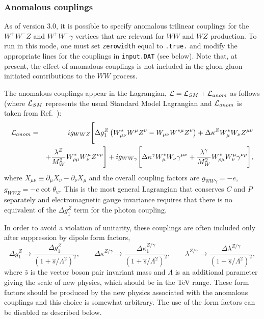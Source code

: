 \documentclass{article}
\begin{document}
\subsubsection{Anomalous couplings}

\label{sec:anomalous}
As of version 3.0, it is possible to specify anomalous trilinear
couplings for the $W^+W^-Z$ and $W^+W^-\gamma$ vertices that are
relevant for $WW$ and $WZ$ production. To run in this mode, one
must set {\tt zerowidth} equal to {\tt .true.}
and modify the appropriate lines for the couplings in {\tt input.DAT}
(see below). Note that, at present, the effect of anomalous couplings is not included
in the gluon-gluon initiated contributions to the $WW$ process.

The anomalous couplings appear in the Lagrangian,
${\cal L} = {\cal L}_{SM} + {\cal L}_{anom}$ as follows
(where ${\cal L}_{SM}$ represents the usual Standard Model Lagrangian and
${\cal L}_{anom}$ is taken from Ref.~\cite{Dixon:1999di}):
\begin{eqnarray}
{\cal L}_{anom} & = & i g_{WWZ} \Biggl[
 \Delta g_1^Z \left( W^*_{\mu\nu}W^\mu Z^\nu - W_{\mu\nu}W^{*\mu} Z^\nu \right)
+\Delta\kappa^Z W^*_\mu W_\nu Z^{\mu\nu} \nonumber \\
 & &+
 \frac{\lambda^Z}{M_W^2} W^*_{\rho\mu} W^\mu_\nu Z^{\nu\rho} \Biggr]
+i g_{WW\gamma} \Biggl[ 
 \Delta\kappa^\gamma W^*_\mu W_\nu \gamma^{\mu\nu}
+\frac{\lambda^\gamma}{M_W^2} W^*_{\rho\mu} W^\mu_\nu\gamma^{\nu\rho}
 \Biggr], \nonumber
\end{eqnarray}
where $X_{\mu\nu} \equiv \partial_\mu X_{\nu} - \partial_\nu X_{\mu}$
and the overall coupling factors are $g_{WW\gamma}=-e$,
$g_{WWZ}=-e\cot\theta_w$.
This is the most general Lagrangian that conserves $C$ and $P$
separately and electromagnetic gauge invariance requires that there
is no equivalent of the $\Delta g_1^Z$ term for the photon coupling.

In order to avoid a violation of unitarity, these couplings are often
included only after suppression by dipole form factors,
\begin{displaymath}
\Delta g_1^Z \rightarrow \frac{\Delta g_1^Z}{(1+\hat{s}/\Lambda^2)^2}, \qquad
\Delta \kappa^{Z/\gamma} \rightarrow
 \frac{\Delta \kappa_1^{Z/\gamma}}{(1+\hat{s}/\Lambda^2)^2}, \qquad
\lambda^{Z/\gamma} \rightarrow
 \frac{\Delta \lambda^{Z/\gamma}}{(1+\hat{s}/\Lambda^2)^2},
\end{displaymath}
where $\hat{s}$ is the vector boson pair invariant mass and $\Lambda$
is an additional parameter giving the scale of new physics, which should
be in the TeV range.
These form factors should be produced by the new physics associated with the
anomalous couplings and this choice is somewhat arbitrary. The use of the form
factors can be disabled as described below.
\end{document}
